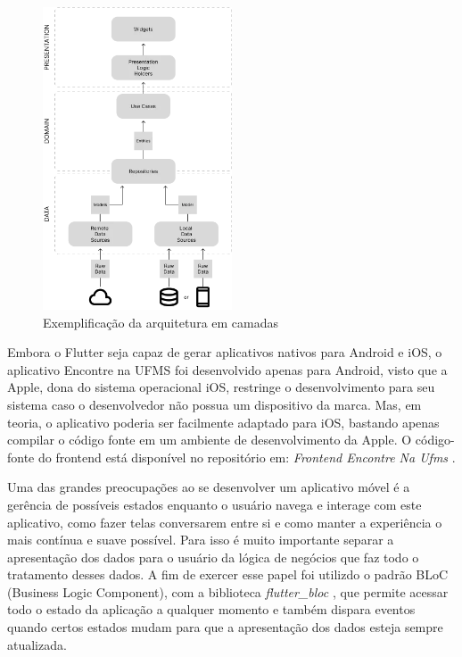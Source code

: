     \begin{figure}[h]
        \centering
        \includegraphics[width=0.5\textwidth]{imagens/cleanarch.png}
        \caption{\scriptsize Exemplificação da arquitetura em camadas}
        \footnotesize  {}
        \label{fig:clean-architecture}
    \end{figure}

    \FloatBarrier

    Embora o Flutter seja capaz de gerar aplicativos nativos para Android e iOS, o aplicativo Encontre na UFMS foi desenvolvido apenas para Android, visto que a Apple, dona do sistema operacional iOS, restringe o desenvolvimento para seu sistema caso o desenvolvedor não possua um dispositivo da marca. Mas, em teoria, o aplicativo poderia ser facilmente adaptado para iOS, bastando apenas compilar o código fonte em um ambiente de desenvolvimento da Apple. O código-fonte do frontend está disponível no repositório em: \textit{Frontend Encontre Na Ufms} \cite{frontend}.

    Uma das grandes preocupações ao se desenvolver um aplicativo móvel é a gerência de possíveis estados enquanto o usuário navega e interage com este aplicativo, como fazer telas conversarem entre si e como manter a experiência o mais contínua e suave possível. Para isso é muito importante separar a apresentação dos dados para o usuário da lógica de negócios que faz todo o tratamento desses dados. A fim de exercer esse papel foi utilizdo o padrão BLoC (Business Logic Component), com a biblioteca \textit{flutter\_bloc} \cite{flutterbloc}, que permite acessar todo o estado da aplicação a qualquer momento e também dispara eventos quando certos estados mudam para que a apresentação dos dados esteja sempre atualizada.

